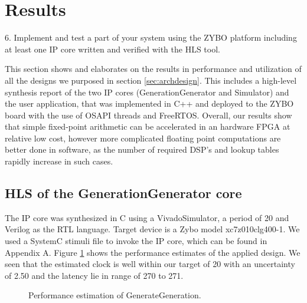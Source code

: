 \section{Results}\label{sec:results}
\begin{framed}
6. Implement and test a part of your system using the ZYBO platform including at least one IP core written and verified with the HLS tool.
\end{framed}

This section shows and elaborates on the results in performance and utilization of all the designs we purposed in section \ref{sec:archdesign}. This includes a high-level synthesis report of the two IP cores (GenerationGenerator and Simulator) and the user application, that was implemented in C++ and deployed to the ZYBO board with the use of OSAPI threads and FreeRTOS. Overall, our results show that simple fixed-point arithmetic can be accelerated in an hardware FPGA at relative low cost, however more complicated floating point computations are better done in software, as the number of required DSP's and lookup tables rapidly increase in such cases.

\subsection{HLS of the GenerationGenerator core}

The IP core was synthesized in C using a VivadoSimulator, a period of 20 and Verilog as the RTL language. Target device is a Zybo model xc7z010clg400-1. We used a SystemC stimuli file to invoke the IP core, which can be found in Appendix A. Figure \ref{fig:ggperformanceestimates} shows the performance estimates of the applied design. We seen that the estimated clock is well within our target of 20 with an uncertainty of 2.50 and the latency lie in range of 270 to 271.

\begin{figure}[h!]
	\centering
	\caption{Performance estimation of GenerateGeneration.}
	\label{fig:ggperformanceestimates}
\end{figure}

